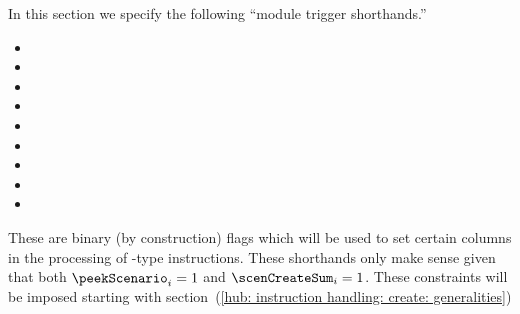 In this section we specify the following ``module trigger shorthands.''
\begin{multicols}{3}
\begin{itemize}
	\item \locTriggerMxp{}
	\item \locTriggerStp{}
	\item \locTriggerMmu{}
	\item \locTriggerOob{}
	\item \locTriggerOobX{}
	\item \locTriggerOobU{}
	\item \locTriggerHashInfo{}
	\item \locTriggerRlpAddr{}
	\item \locTriggerRomLex{}
\end{itemize}
\end{multicols}
\noindent These are binary (by construction) flags which will be used to set certain columns in the processing of -type instructions.
\saNote{} These shorthands only make sense given that both $\peekScenario_{i} = 1$ and $\scenCreateSum_{i} = 1$. These constraints will be imposed starting with section~(\ref{hub: instruction handling: create: generalities})
